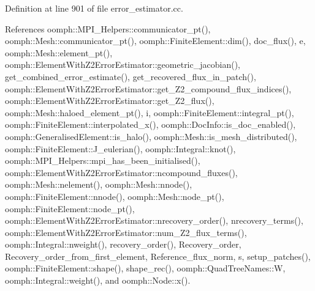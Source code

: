 Definition at line 901 of file error\+\_\+estimator.\+cc.



References oomph\+::\+M\+P\+I\+\_\+\+Helpers\+::communicator\+\_\+pt(), oomph\+::\+Mesh\+::communicator\+\_\+pt(), oomph\+::\+Finite\+Element\+::dim(), doc\+\_\+flux(), e, oomph\+::\+Mesh\+::element\+\_\+pt(), oomph\+::\+Element\+With\+Z2\+Error\+Estimator\+::geometric\+\_\+jacobian(), get\+\_\+combined\+\_\+error\+\_\+estimate(), get\+\_\+recovered\+\_\+flux\+\_\+in\+\_\+patch(), oomph\+::\+Element\+With\+Z2\+Error\+Estimator\+::get\+\_\+\+Z2\+\_\+compound\+\_\+flux\+\_\+indices(), oomph\+::\+Element\+With\+Z2\+Error\+Estimator\+::get\+\_\+\+Z2\+\_\+flux(), oomph\+::\+Mesh\+::haloed\+\_\+element\+\_\+pt(), i, oomph\+::\+Finite\+Element\+::integral\+\_\+pt(), oomph\+::\+Finite\+Element\+::interpolated\+\_\+x(), oomph\+::\+Doc\+Info\+::is\+\_\+doc\+\_\+enabled(), oomph\+::\+Generalised\+Element\+::is\+\_\+halo(), oomph\+::\+Mesh\+::is\+\_\+mesh\+\_\+distributed(), oomph\+::\+Finite\+Element\+::\+J\+\_\+eulerian(), oomph\+::\+Integral\+::knot(), oomph\+::\+M\+P\+I\+\_\+\+Helpers\+::mpi\+\_\+has\+\_\+been\+\_\+initialised(), oomph\+::\+Element\+With\+Z2\+Error\+Estimator\+::ncompound\+\_\+fluxes(), oomph\+::\+Mesh\+::nelement(), oomph\+::\+Mesh\+::nnode(), oomph\+::\+Finite\+Element\+::nnode(), oomph\+::\+Mesh\+::node\+\_\+pt(), oomph\+::\+Finite\+Element\+::node\+\_\+pt(), oomph\+::\+Element\+With\+Z2\+Error\+Estimator\+::nrecovery\+\_\+order(), nrecovery\+\_\+terms(), oomph\+::\+Element\+With\+Z2\+Error\+Estimator\+::num\+\_\+\+Z2\+\_\+flux\+\_\+terms(), oomph\+::\+Integral\+::nweight(), recovery\+\_\+order(), Recovery\+\_\+order, Recovery\+\_\+order\+\_\+from\+\_\+first\+\_\+element, Reference\+\_\+flux\+\_\+norm, s, setup\+\_\+patches(), oomph\+::\+Finite\+Element\+::shape(), shape\+\_\+rec(), oomph\+::\+Quad\+Tree\+Names\+::W, oomph\+::\+Integral\+::weight(), and oomph\+::\+Node\+::x().

\mbox{\label{classoomph_1_1Z2ErrorEstimator_a2b6e14d5dcec19bd6cb97b5395f25579}} 
